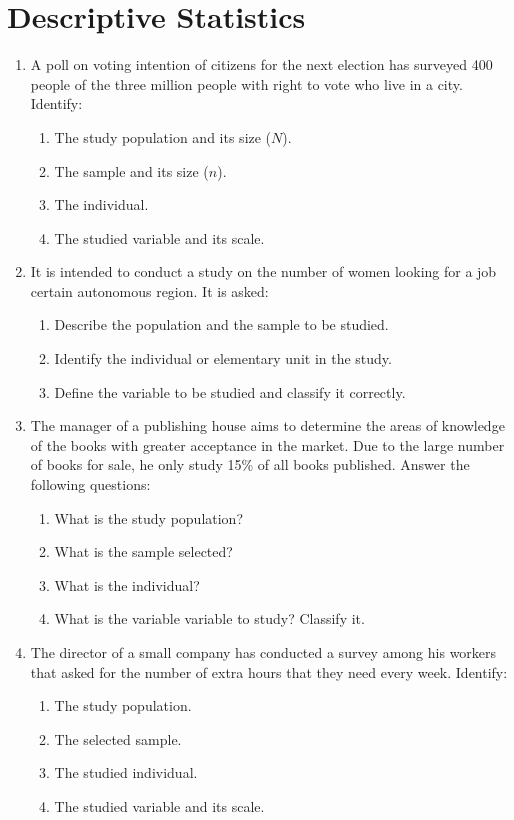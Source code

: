 
\section{Descriptive Statistics}
\begin{enumerate}[leftmargin=*,resume]
\item A poll on voting intention of citizens for the next election has surveyed 400 people of the three million people with right
to vote who live in a city. Identify:
\begin{enumerate}
\item The study population and its size ($N$).
\item The sample and its size ($n$).
\item The individual.
\item The studied variable and its scale.
\end{enumerate}


\item It is intended to conduct a study on the number of women looking for a job certain autonomous region. It is asked:
\begin{enumerate}
\item Describe the population and the sample to be studied.
\item Identify the individual or elementary unit in the study.
\item Define the variable to be studied and classify it correctly.
\end{enumerate}


\item The manager of a publishing house aims to determine the areas of knowledge of the books with greater acceptance in the
market.
Due to the large number of books for sale, he only study 15\% of all books published. 
Answer the following questions:
\begin{enumerate}
\item What is the study population?
\item What is the sample selected?
\item What is the individual?
\item What is the variable variable to study? Classify it.
\end{enumerate}

\item The director of a small company has conducted a survey among his workers that asked for the number of extra hours that they
need every week. 
Identify: 
\begin{enumerate}
\item The study population.
\item The selected sample.
\item The studied individual.
\item The studied variable and its scale.
\end{enumerate}


\end{enumerate}

